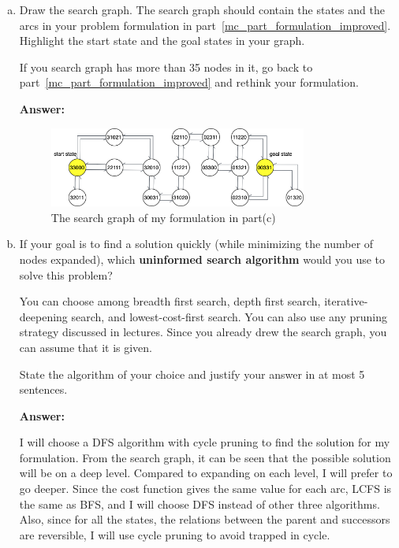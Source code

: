 \documentclass[12pt]{article}
\begin{document}
\begin{enumerate}[(a)]
\item
\label{mc_part_graph}
Draw the search graph. The search graph should contain the states and the arcs in your problem formulation in part~\ref{mc_part_formulation_improved}. Highlight the start state and the goal states in your graph.

If you search graph has more than 35 nodes in it, go back to part~\ref{mc_part_formulation_improved} and rethink your formulation.

{\bf Answer:}
\begin{figure}[ht]
\centering
\includegraphics[width=0.8\textwidth]{a1q1e.png}
\caption{The search graph of my formulation in part(c)}
\label{a1q1d}
\end{figure}




\item
If your goal is to find a solution quickly (while minimizing the number of nodes expanded), which {\bf uninformed search algorithm} would you use to solve this problem?

You can choose among breadth first search, depth first search, iterative-deepening search, and lowest-cost-first search. You can also use any pruning strategy discussed in lectures. Since you already drew the search graph, you can assume that it is given.

State the algorithm of your choice and justify your answer in at most 5 sentences.

{\bf Answer:}

I will choose a DFS algorithm with cycle pruning to find the solution for my formulation. From the search graph, it can be seen that the possible solution will be on a deep level. Compared to expanding on each level, I will prefer to go deeper. Since the cost function gives the same value for each arc, LCFS is the same as BFS, and I will choose DFS instead of other three algorithms. Also, since for all the states, the relations between the parent and successors are reversible, I will use cycle pruning to avoid trapped in cycle.





\end{enumerate}
\end{document}
